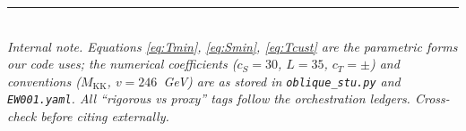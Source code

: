 \documentclass[11pt]{article}
\newcommand{\MKK}{M_{\mathrm{KK}}}
\newcommand{\vev}{v}
\newcommand{\code}[1]{\texttt{#1}}
\theoremstyle{definition}
\begin{document}
\bigskip
\noindent\rule{\linewidth}{0.4pt}\\
\footnotesize
\emph{Internal note. Equations \eqref{eq:Tmin}, \eqref{eq:Smin}, \eqref{eq:Tcust}
are the parametric forms our code uses; the numerical coefficients
($c_S=30$, $L=35$, $c_T=\pm$) and conventions ($\MKK$, $\vev=246$~GeV) are as
stored in \code{oblique\_stu.py} and \code{EW001.yaml}. All ``rigorous vs proxy''
tags follow the orchestration ledgers. Cross-check before citing externally.}
\end{document}
